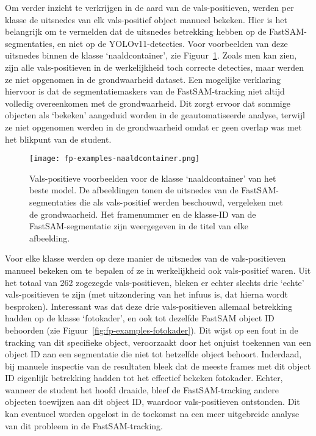 Om verder inzicht te verkrijgen in de aard van de vals-positieven, werden per klasse de uitsnedes van elk vals-positief object manueel bekeken.
Hier is het belangrijk om te vermelden dat de uitsnedes betrekking hebben op de FastSAM-segmentaties,
en niet op de YOLOv11-detecties.
Voor voorbeelden van deze uitsnedes binnen de klasse `naaldcontainer', zie Figuur~\ref{fig:fp-examples-naaldcontainer}.
Zoals men kan zien, zijn alle vals-positieven in de werkelijkheid toch correcte detecties, maar werden ze niet opgenomen in de grondwaarheid dataset.
Een mogelijke verklaring hiervoor is dat de segmentatiemaskers van de FastSAM-tracking niet altijd volledig 
overeenkomen met de grondwaarheid.
Dit zorgt ervoor dat sommige objecten als `bekeken' aangeduid worden in de geautomatiseerde analyse, 
terwijl ze niet opgenomen werden in de grondwaarheid omdat er geen overlap was met het blikpunt van de student.
\begin{figure}[H]
    \centering
    \texttt{[image: fp-examples-naaldcontainer.png]}
    \caption[]{\label{fig:fp-examples-naaldcontainer}
    Vals-positieve voorbeelden voor de klasse `naaldcontainer' van het beste model.
    De afbeeldingen tonen de uitsnedes van de FastSAM-segmentaties die als vals-positief werden beschouwd, vergeleken met de grondwaarheid.
    Het framenummer en de klasse-ID van de FastSAM-segmentatie zijn weergegeven in de titel van elke afbeelding.
    }
\end{figure}

Voor elke klasse werden op deze manier de uitsnedes van de vals-positieven manueel bekeken om te bepalen of ze in werkelijkheid ook vals-positief waren.
Uit het totaal van 262 zogezegde vals-positieven, bleken er echter slechts drie `echte' vals-positieven te zijn (met uitzondering van het infuus is, dat hierna wordt besproken).
Interessant was dat deze drie vals-positieven allemaal betrekking hadden op de klasse `fotokader', en ook tot dezelfde FastSAM object ID behoorden (zie Figuur~\ref{fig:fp-examples-fotokader}).
Dit wijst op een fout in de tracking van dit specifieke object, veroorzaakt door het onjuist toekennen van een object ID aan een segmentatie die niet tot hetzelfde object behoort.
Inderdaad, bij manuele inspectie van de resultaten bleek dat de meeste frames met dit object ID eigenlijk betrekking hadden tot het effectief bekeken fotokader.
Echter, wanneer de student het hoofd draaide, bleef de FastSAM-tracking andere objecten toewijzen aan dit object ID, waardoor vals-positieven ontstonden.
Dit kan eventueel worden opgelost in de toekomst na een meer uitgebreide analyse van dit probleem in de FastSAM-tracking.

